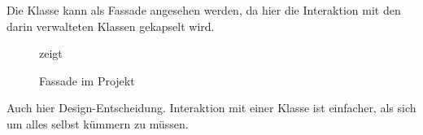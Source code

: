 
Die Klasse  kann als Fassade angesehen werden, da hier die Interaktion mit den darin verwalteten Klassen gekapselt wird.











\begin{figure}[ht!]
\vspace{0.25cm}
\begin{center}
\caption{Fassade im Projekt}
\label{fig:Fas}
\end{center}

\vspace{0.25cm}
 zeigt \missing\
\end{figure}




Auch hier Design-Entscheidung. Interaktion mit einer Klasse ist einfacher, als sich um alles selbst kümmern zu müssen.




